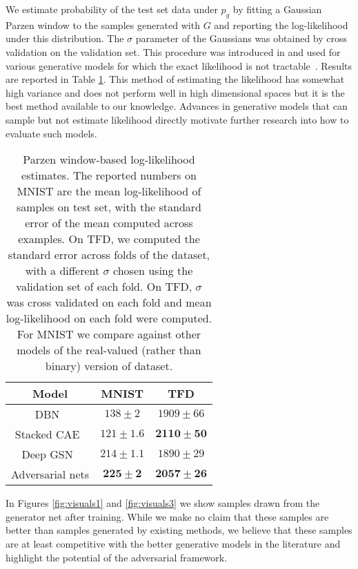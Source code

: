 \documentclass{article}
\begin{document}
We estimate probability of the test set data under $p_g$ by fitting a Gaussian Parzen window to the samples
generated with $G$ and reporting the log-likelihood under this distribution.
The $\sigma$ parameter of the Gaussians
was obtained by cross validation on the validation set. This procedure was introduced in  \citet{Breuleux+Bengio-2011}
and used for various generative models for which the exact likelihood is
not
tractable~\citep{Rifai-icml2012,Bengio-et-al-ICML2013,Bengio-et-al-ICML2014}. Results
are reported in Table \ref{table:parzen}. This method of estimating the likelihood has somewhat high variance
and does not perform well in high dimensional spaces but it is the best method available to our knowledge.
Advances in generative models that can sample but not estimate likelihood directly motivate further research
into how to evaluate such models.

\begin{table}
\centering
\begin{tabular}{c|c|c}
Model & MNIST & TFD \\
\hline
DBN~\citep{Bengio-et-al-ICML2013} & $138 \pm 2$ & $1909 \pm 66$ \\
Stacked CAE~\citep{Bengio-et-al-ICML2013} & $121 \pm 1.6$ & $\mathbf{2110 \pm 50}$ \\
Deep GSN~\citep{Bengio-et-al-ICML-2014} & $214 \pm 1.1$ & $1890 \pm 29$ \\
Adversarial nets & $\mathbf{225 \pm 2}$ & $\mathbf{2057 \pm 26}$
\end{tabular}
\caption{\small
Parzen window-based log-likelihood estimates. The reported numbers on MNIST are the mean log-likelihood of samples on test set,
with the standard error of the mean computed across examples.
On TFD, we computed the standard error across folds of the dataset, with a different $\sigma$ chosen using the validation set
of each fold.
On TFD, $\sigma$ was cross validated on each fold and mean log-likelihood on each fold were computed.
For MNIST we compare against other models of the real-valued (rather than binary) version of dataset.}
\label{table:parzen}
\end{table}

In Figures \ref{fig:visuals1} and \ref{fig:visuals3} we
show samples drawn from the generator net after training. 
While we make no claim that these samples are better than
samples generated by existing methods, we believe that these samples are at
least competitive with the better generative models in the literature and
highlight the potential of the adversarial framework.
\end{document}
